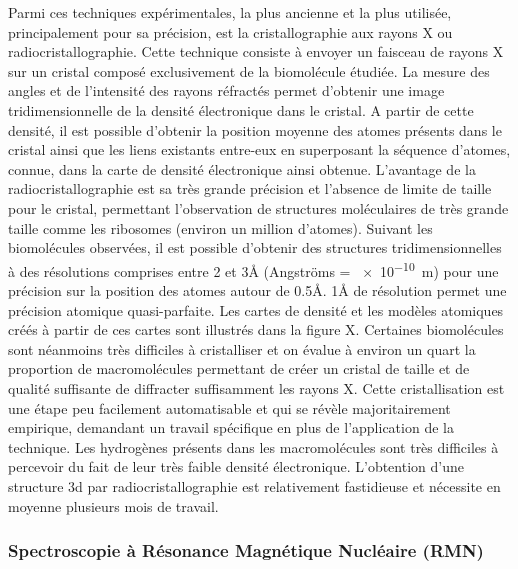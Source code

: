 Parmi ces techniques expérimentales, la plus ancienne et la plus utilisée, principalement pour sa précision, est la cristallographie aux rayons X ou radiocristallographie. Cette technique consiste à envoyer un faisceau de rayons X sur un cristal composé exclusivement de la biomolécule étudiée. La mesure des angles et de l'intensité des rayons réfractés permet d'obtenir une image tridimensionnelle de la densité électronique dans le cristal. A partir de cette densité, il est possible d'obtenir la position moyenne des atomes présents dans le cristal ainsi que les liens existants entre-eux en superposant la séquence d'atomes, connue, dans la carte de densité électronique ainsi obtenue. 
L'avantage de la radiocristallographie est sa très grande précision et l'absence de limite de taille pour le cristal, permettant l'observation de structures moléculaires de très grande taille comme les ribosomes (environ un million d'atomes). Suivant les biomolécules observées, il est possible d'obtenir des structures tridimensionnelles à des résolutions comprises entre 2 et 3\r{A} (Angströms = \SI{e-10}{\metre}) pour une précision sur la position des atomes autour de 0.5\r{A}. 1\r{A} de résolution permet une précision atomique quasi-parfaite. Les cartes de densité et les modèles atomiques créés à partir de ces cartes sont illustrés dans la figure X. 
Certaines biomolécules sont néanmoins très difficiles à cristalliser et on évalue à environ un quart la proportion de macromolécules permettant de créer un cristal de taille et de qualité suffisante de diffracter suffisamment les rayons X. Cette cristallisation est une étape peu facilement automatisable et qui se révèle majoritairement empirique, demandant un travail spécifique en plus de l'application de la technique. Les hydrogènes présents dans les macromolécules sont très difficiles à percevoir du fait de leur très faible densité électronique. L'obtention d'une structure 3d par radiocristallographie est relativement fastidieuse et nécessite en moyenne plusieurs mois de travail.

\subsubsection{Spectroscopie à Résonance Magnétique Nucléaire (RMN)}

